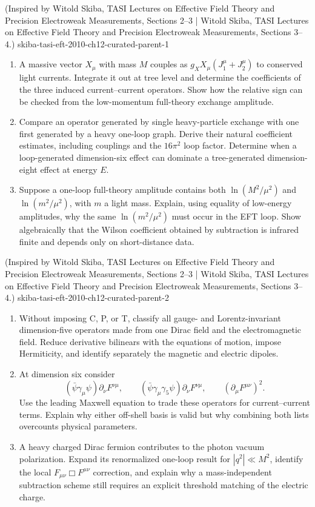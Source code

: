 \begin{enumerate}
  {(Inspired by Witold Skiba, TASI Lectures on Effective Field Theory and Precision Electroweak Measurements, Sections 2--3 | Witold Skiba, TASI Lectures on Effective Field Theory and Precision Electroweak Measurements, Sections 3--4.)}
  {skiba-tasi-eft-2010-ch12-curated-parent-1}
\begin{enumerate}
\item
A massive vector \(X_\mu\) with mass \(M\) couples as
\(g_X X_\mu(J_1^\mu+J_2^\mu)\) to conserved light currents.  Integrate it
out at tree level and determine the coefficients of the three induced
current--current operators.  Show how the relative sign can be checked
from the low-momentum full-theory exchange amplitude.
\item
Compare an operator generated by single heavy-particle exchange with one
first generated by a heavy one-loop graph.  Derive their natural coefficient
estimates, including couplings and the \(16\pi^2\) loop factor.  Determine
when a loop-generated dimension-six effect can dominate a tree-generated
dimension-eight effect at energy \(E\).
\item
Suppose a one-loop full-theory amplitude contains both
\(\ln(M^2/\mu^2)\) and \(\ln(m^2/\mu^2)\), with \(m\) a light mass.
Explain, using equality of low-energy amplitudes, why the same
\(\ln(m^2/\mu^2)\) must occur in the EFT loop.  Show algebraically that the
Wilson coefficient obtained by subtraction is infrared finite and depends
only on short-distance data.
\end{enumerate}

  {(Inspired by Witold Skiba, TASI Lectures on Effective Field Theory and Precision Electroweak Measurements, Sections 2--3 | Witold Skiba, TASI Lectures on Effective Field Theory and Precision Electroweak Measurements, Sections 3--4.)}
  {skiba-tasi-eft-2010-ch12-curated-parent-2}
\begin{enumerate}
\item
Without imposing C, P, or T, classify all gauge- and Lorentz-invariant
dimension-five operators made from one Dirac field and the electromagnetic
field.  Reduce derivative bilinears with the equations of motion, impose
Hermiticity, and identify separately the magnetic and electric dipoles.
\item
At dimension six consider
\[
 (\bar\psi\gamma_\mu\psi)\partial_\nu F^{\nu\mu},\qquad
 (\bar\psi\gamma_\mu\gamma_5\psi)\partial_\nu F^{\nu\mu},\qquad
 (\partial_\mu F^{\mu\nu})^2.
\]
Use the leading Maxwell equation to trade these operators for
current--current terms.  Explain why either off-shell basis is valid but
why combining both lists overcounts physical parameters.
\item
A heavy charged Dirac fermion contributes to the photon vacuum
polarization.  Expand its renormalized one-loop result for
\(|q^2|\ll M^2\), identify the local \(F_{\mu\nu}\Box F^{\mu\nu}\)
correction, and explain why a mass-independent subtraction scheme still
requires an explicit threshold matching of the electric charge.
\end{enumerate}


\end{enumerate}

